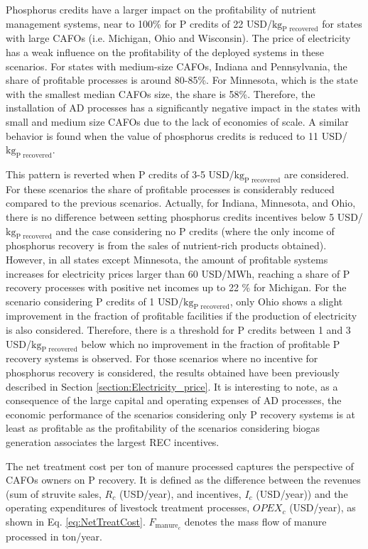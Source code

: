 \begin{refsection}[referencesCh5]
Phosphorus credits have a larger impact on the profitability of nutrient management systems, near to 100\% for P credits of 22 USD/${\text{kg}_\text{P recovered}}$ for states with large CAFOs (i.e. Michigan, Ohio and Wisconsin). The price of electricity has a weak influence on the profitability of the deployed systems in these scenarios. For states with medium-size CAFOs, Indiana and Pennsylvania, the share of profitable processes is around 80-85\%. For Minnesota, which is the state with the smallest median CAFOs size, the share is 58\%. Therefore, the installation of AD processes has a significantly negative impact in the states with small and medium size CAFOs due to the lack of economies of scale. A similar behavior is found when the value of phosphorus credits is reduced to 11 USD/${\text{kg}_\text{P recovered}}$.

This pattern is reverted when P credits of 3-5 USD/${\text{kg}_\text{P recovered}}$ are considered. For these scenarios the share of profitable processes is considerably reduced compared to the previous scenarios. Actually, for Indiana, Minnesota, and Ohio, there is no difference between setting phosphorus credits incentives below 5 USD/${\text{kg}_\text{P recovered}}$ and the case considering no P credits (where the only income of phosphorus recovery is from the sales of nutrient-rich products obtained). However, in all states except Minnesota, the amount of profitable systems increases for electricity prices larger than 60 USD/MWh, reaching a share of P recovery processes with positive net incomes up to 22 \% for Michigan. For the scenario considering P credits of 1 USD/${\text{kg}_\text{P recovered}}$, only Ohio shows a slight improvement in the fraction of profitable facilities if the production of electricity is also considered. Therefore, there is a threshold for P credits between 1 and 3 USD/$\text{kg}_\text{P recovered}$ below which no improvement in the fraction of profitable P recovery systems is observed. For those scenarios where no incentive for phosphorus recovery is considered, the results obtained have been previously described in Section \ref{section:Electricity_price}. It is interesting to note, as a consequence of the large capital and operating expenses of AD processes, the economic performance of the scenarios considering only P recovery systems is at least as profitable as the profitability of the scenarios considering biogas generation associates the largest REC incentives.

The net treatment cost per ton of manure processed captures the perspective of CAFOs owners on P recovery. It is defined as the difference between the revenues (sum of struvite sales, $R_{c}$ (USD/year), and incentives, $I_{c}$ (USD/year)) and the operating expenditures of livestock treatment processes, $OPEX_{c}$ (USD/year), as shown in Eq. \ref{eq:NetTreatCost}. $F_{\text{manure}_{c}}$ denotes the mass flow of manure processed in ton/year.


\end{refsection}
